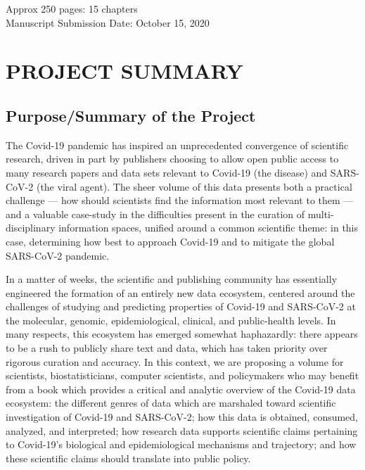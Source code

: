 \documentclass{statsoc}
\title[Cross-Disciplinary Data Integration for Covid-19]{%
\begin{center}
Cross-Disciplinary Data Integration Models \\for the\\New Covid-19 Data Ecosystem
\end{center}
}
\author[Amy Neustein]{Amy Neustein}
\author[Amy Neustein]{Nathaniel Christen}
\newcommand{\p}[1]{

\vspace{.75em}#1}
\begin{document}
\vspace{1em}
\noindent{}Approx 250 pages: 15 chapters\\
Manuscript Submission Date: October 15, 2020\\

{\fontsize{10}{14}\selectfont
\section{PROJECT SUMMARY}

\subsection{Purpose/Summary of the Project}
\p{The Covid-19 pandemic has inspired an unprecedented 
convergence of scientific research, driven in part 
by publishers choosing to allow open public access 
to many research papers and data sets 
relevant to Covid-19 (the disease) and SARS-CoV-2 
(the viral agent).  The sheer volume of this data 
presents both a practical challenge --- how should 
scientists find the information most relevant to them 
--- and a valuable case-study in the difficulties present 
in the curation of multi-disciplinary 
information spaces, unified around a common 
scientific theme: in this case, 
determining how best to approach Covid-19 and to 
mitigate the global SARS-CoV-2 pandemic.}

\p{In a matter of weeks, the scientific and publishing 
community has essentially engineered the formation of 
an entirely new data ecosystem, centered around the 
challenges of studying and predicting properties 
of Covid-19 and SARS-CoV-2 at the molecular, genomic, 
epidemiological, clinical, and public-health levels.  
In many respects, this ecosystem has emerged somewhat 
haphazardly: there appears to be a rush to publicly 
share text and data, which has taken priority over 
rigorous curation and accuracy.  In this context, 
we are proposing a volume for scientists, 
biostatisticians, computer 
scientists, and policymakers who may benefit from a 
book which provides a critical and analytic 
overview of the Covid-19 data ecosystem: the 
different genres of data which are marshaled 
toward scientific investigation of Covid-19 
and SARS-CoV-2; how this data is obtained, 
consumed, analyzed, and interpreted; how 
research data supports scientific claims 
pertaining to Covid-19's biological and 
epidemiological mechanisms and trajectory; 
and how these scientific claims should 
translate into public policy.} 

}
\end{document}
